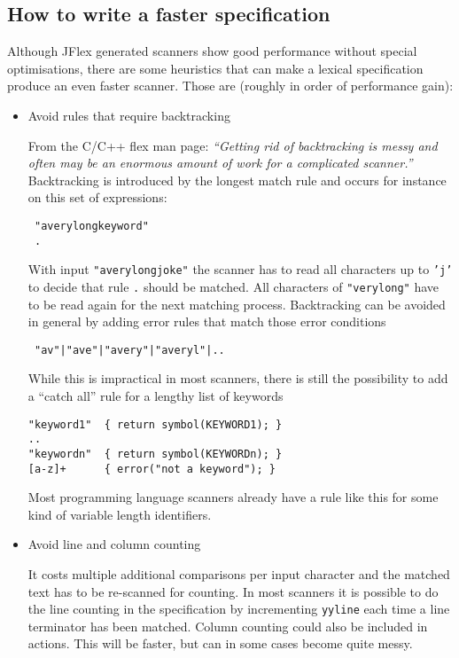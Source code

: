 \documentclass[11pt]{scrartcl}
\newcommand{\trit}{\em}
\begin{document}
\subsection{How to write a faster specification\label{PerformanceTips}}
Although JFlex generated scanners show good performance without
special optimisations, there are some heuristics that can make a
lexical specification produce an even faster scanner. Those are
(roughly in order of performance gain):
 
\begin{itemize}
\item
Avoid rules that require backtracking

From the C/C++ flex \cite{flex} man page: {\trit ``Getting rid
of backtracking is messy and often may be an enormous amount of work for
a complicated scanner.''} Backtracking is introduced by the longest match
rule and occurs for instance on this set of expressions:
 
\texttt{  "averylongkeyword"}\\
\texttt{  .}
 
With input \texttt{"averylongjoke"} the scanner has to read all characters
up to \texttt{'j' }to decide that rule \texttt{.} should be matched. All
characters of \texttt{"verylong"} have to be read again for the next
matching process. Backtracking can be avoided in general by adding
error rules that match those error conditions 

\verb+ "av"|"ave"|"avery"|"averyl"|..+

While this is impractical in most scanners, there is still the
possibility to add a ``catch all'' rule for a lengthy list of keywords
\begin{verbatim}
"keyword1"  { return symbol(KEYWORD1); } 
.. 
"keywordn"  { return symbol(KEYWORDn); }
[a-z]+      { error("not a keyword"); }
\end{verbatim}
Most programming language scanners already have a rule like this for
some kind of variable length identifiers.

\item
  Avoid line and column counting
  
  It costs multiple additional comparisons per input character and the
  matched text has to be re-scanned for counting. In most scanners it
  is possible to do the line counting in the specification by
  incrementing \texttt{yyline} each time a line terminator has been
  matched.  Column counting could also be included in actions. This
  will be faster, but can in some cases become quite messy.
 

\end{itemize}
\end{document}
